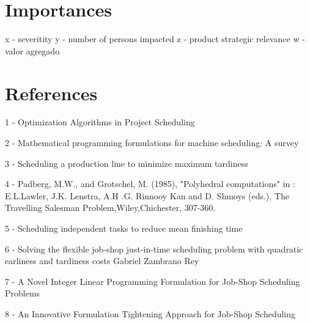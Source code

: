 \documentclass[12pt]{article}
\begin{document}


\section*{Importances}

x - severitity
y - number of persons impacted
z - product strategic relevance
w - valor agregado

\section*{References}

1 - Optimization Algorithms in Project Scheduling

2 - Mathematical programming formulations for machine scheduling: A survey

3 - Scheduling a production line to minimize maximum tardiness

4 - Padberg, M.W., and Grotschel, M. (1985), "Polyhedral computations" in : E.L.Lawler, J.K. Lenstra, A.H .G. Rinnooy Kan and D. Shmoys (eds.), The Travelling Salesman Problem,Wiley,Chichester, 307-360.

5 - Scheduling independent tasks to reduce mean finishing time 

6 - Solving the flexible job-shop just-in-time scheduling problem
with quadratic earliness and tardiness costs Gabriel Zambrano Rey

7 - A Novel Integer Linear Programming Formulation for Job-Shop
Scheduling Problems

8 - An Innovative Formulation Tightening Approach for Job-Shop
Scheduling


\end{document}
